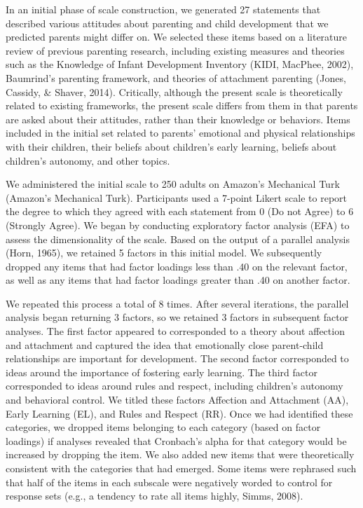 \documentclass[floatsintext,man]{apa6}
\theoremstyle{definition}
\theoremstyle{definition}
\theoremstyle{definition}
\theoremstyle{remark}
\begin{document}
In an initial phase of scale construction, we generated 27 statements
that described various attitudes about parenting and child development
that we predicted parents might differ on. We selected these items based
on a literature review of previous parenting research, including
existing measures and theories such as the Knowledge of Infant
Development Inventory (KIDI, MacPhee, 2002), Baumrind's parenting
framework, and theories of attachment parenting (Jones, Cassidy, \&
Shaver, 2014). Critically, although the present scale is theoretically
related to existing frameworks, the present scale differs from them in
that parents are asked about their attitudes, rather than their
knowledge or behaviors. Items included in the initial set related to
parents' emotional and physical relationships with their children, their
beliefs about children's early learning, beliefs about children's
autonomy, and other topics.

We administered the initial scale to 250 adults on Amazon's Mechanical
Turk (Amazon's Mechanical Turk). Participants used a 7-point Likert
scale to report the degree to which they agreed with each statement from
0 (Do not Agree) to 6 (Strongly Agree). We began by conducting
exploratory factor analysis (EFA) to assess the dimensionality of the
scale. Based on the output of a parallel analysis (Horn, 1965), we
retained 5 factors in this initial model. We subsequently dropped any
items that had factor loadings less than .40 on the relevant factor, as
well as any items that had factor loadings greater than .40 on another
factor.

We repeated this process a total of 8 times. After several iterations,
the parallel analysis began returning 3 factors, so we retained 3
factors in subsequent factor analyses. The first factor appeared to
corresponded to a theory about affection and attachment and captured the
idea that emotionally close parent-child relationships are important for
development. The second factor corresponded to ideas around the
importance of fostering early learning. The third factor corresponded to
ideas around rules and respect, including children's autonomy and
behavioral control. We titled these factors Affection and Attachment
(AA), Early Learning (EL), and Rules and Respect (RR). Once we had
identified these categories, we dropped items belonging to each category
(based on factor loadings) if analyses revealed that Cronbach's alpha
for that category would be increased by dropping the item. We also added
new items that were theoretically consistent with the categories that
had emerged. Some items were rephrased such that half of the items in
each subscale were negatively worded to control for response sets (e.g.,
a tendency to rate all items highly, Simms, 2008).
\end{document}
